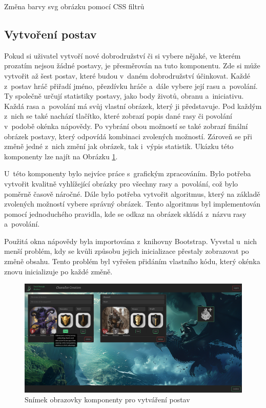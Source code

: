 \begin{listing}[H]
  \inputminted[breaklines]{css}{resources/code/svg_color.css}
  \caption{Změna barvy svg obrázku pomocí CSS filtrů}
  \label{code:svg_filter}
\end{listing}

\subsection{Vytvoření postav}
Pokud si uživatel vytvoří nové dobrodružství či si vybere nějaké, ve kterém prozatím nejsou žádné postavy, je přesměrován na tuto komponentu. Zde si může vytvořit až šest postav, které budou v~daném dobrodružství účinkovat. Každé z~postav hráč přiřadí jméno, přezdívku hráče a~dále vybere její rasu a~povolání. Ty společně určují statistiky postavy, jako body životů, obranu a~iniciativu. Každá rasa a~povolání má svůj vlastní obrázek, který ji představuje. Pod každým z~nich se také nachází tlačítko, které zobrazí popis dané rasy či povolání v~podobě okénka nápovědy. Po vybrání obou možností se také zobrazí finální obrázek postavy, který odpovídá kombinaci zvolených možností. Zároveň se při změně jedné z~nich změní jak obrázek, tak i~výpis statistik. Ukázku této komponenty lze najít na Obrázku \ref{fig:character-creation}.

U~této komponenty bylo nejvíce práce s~grafickým zpracováním. Bylo potřeba vytvořit kvalitně vyhlížející obrázky pro všechny rasy a~povolání, což bylo poměrně časově náročné. Dále bylo potřeba vytvořit algoritmus, který na základě zvolených možností vybere správný obrázek. Tento algoritmus byl implementován pomocí jednoduchého pravidla, kde se odkaz na obrázek skládá z~názvu rasy a~povolání.

Použitá okna nápovědy byla importována z~knihovny Bootstrap. Vyvstal u~nich menší problém, kdy se kvůli způsobu jejich inicializace přestaly zobrazovat po změně obsahu. Tento problém byl vyřešen přidáním vlastního kódu, který okénka znovu inicializuje po každé změně.

\begin{figure}[H]
  \centering
  \includegraphics[width=\textwidth]{resources/figures/TTS-Charracter Creation.png}
  \caption{Snímek obrazovky komponenty pro vytváření postav}
  \label{fig:character-creation}
\end{figure}

